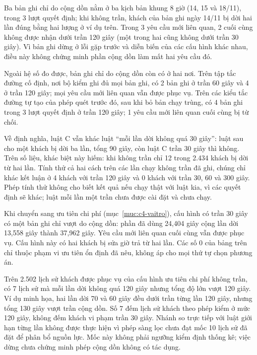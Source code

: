 Ba bản ghi chỉ do cộng dồn nằm ở ba kịch bản khung 8 giờ (14, 15 và 18/11), trong 3 lượt quyết định; khi không trần,
khách của bản ghi ngày 14/11 bị dời hai lần đúng bằng hai lượng ở ví dụ trên. Trong 3 yêu cầu mới liên quan, 2 cuối
cùng không được nhận dưới trần 120 giây (một trong hai cũng không dưới trần 30 giây). Vì bản ghi dừng ở lỗi gặp trước
và diễn biến của các cấu hình khác nhau, điều này không chứng minh phần cộng dồn làm mất hai yêu cầu đó.

Ngoài hệ số đo được, bản ghi chỉ do cộng dồn còn có ở hai nơi. Trên tập tắc đường cố định, nơi bộ kiểm ghi đủ mọi bản
ghi, có 2 bản ghi ở trần 60 giây và 4 ở trần 120 giây; mọi yêu cầu mới liên quan vẫn được phục vụ. Trên các kiểu tắc
đường tự tạo của phép quét trước đó, sau khi bỏ bản chạy trùng, có 4 bản ghi trong 3 lượt quyết định ở trần 120 giây;
1 yêu cầu mới liên quan cuối cùng bị từ chối.

Về định nghĩa, luật C vẫn khác luật ``mỗi lần dời không quá 30 giây'': luật sau cho một khách bị dời ba lần, tổng 90
giây, còn luật C trần 30 giây thì không. Trên số liệu, khác biệt này hiếm: khi không trần chỉ 12 trong 2.434 khách bị
dời từ hai lần. Tính thử cả hai cách trên các lần chạy không trần đã ghi, chúng chỉ khác kết luận ở 4 khách với trần
120 giây và 0 khách với trần 30, 60 và 300 giây. Phép tính thử không cho biết kết quả nếu chạy thật với luật kia, vì
các quyết định sẽ khác; luật mỗi lần một trần chưa được cài đặt và chưa chạy.

Khi chuyển sang ưu tiên chi phí (mục~\ref{muc:c4-vaitro}), cấu hình có trần 30 giây có một bản ghi chỉ vượt
do cộng dồn: phần đã dùng 24,404 giây cộng lần dời 13,558 giây thành 37,962 giây. Yêu cầu mới liên quan cuối
cùng vẫn được phục vụ. Cấu hình này có hai khách bị sửa giờ trả từ hai lần. Các số 0 của bảng trên chỉ thuộc
phạm vi ưu tiên ổn định đã nêu, không áp cho mọi thứ tự chọn phương án.

Trên 2.502 lịch sử khách được phục vụ của cấu hình ưu tiên chi phí không trần, có 7 lịch sử mà mỗi lần dời
không quá 120 giây nhưng tổng độ lớn vượt 120 giây. Ví dụ minh họa, hai lần dời 70 và 60 giây đều dưới trần
từng lần 120 giây, nhưng tổng 130 giây vượt trần cộng dồn. Số 7 đếm lịch sử khách theo phép kiểm ở mức 120
giây, không đếm khách vi phạm trần 30 giây. Nhánh so trực tiếp với luật giới hạn từng lần không được thực
hiện vì phép sàng lọc chưa đạt mốc 10 lịch sử đã đặt để phân bổ nguồn lực. Mốc này không phải ngưỡng kiểm
định thống kê; việc dừng chưa chứng minh phép cộng dồn không có tác dụng.

